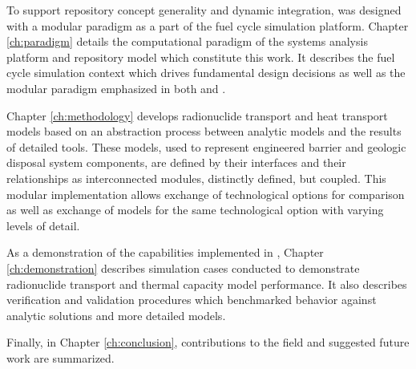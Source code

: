 To support repository concept generality and dynamic integration, \Cyder was 
designed with a modular paradigm as a part of the \Cyclus fuel cycle simulation 
platform. Chapter \ref{ch:paradigm} details the computational paradigm of the 
\Cyclus systems analysis platform and \Cyder repository model which constitute 
this work.  It describes the \Cyclus fuel cycle simulation context which drives 
fundamental \Cyder design decisions as well as the modular paradigm emphasized 
in both \Cyclus and \Cyder. 

Chapter \ref{ch:methodology} develops  radionuclide transport and heat transport 
models based on an abstraction process between analytic models and the results 
of detailed tools.  These models, used to represent engineered barrier and geologic 
disposal system components, are defined by their interfaces and their 
relationships as interconnected modules, distinctly defined, but coupled.  This 
modular implementation allows exchange  of technological options for comparison 
as well as exchange of models for the same technological option with varying 
levels of detail.  

As a demonstration of the capabilities implemented in \Cyder, Chapter 
\ref{ch:demonstration} describes simulation cases conducted to demonstrate 
radionuclide transport and thermal capacity model performance. It also describes 
verification and validation procedures which benchmarked \Cyder behavior against 
analytic solutions and more detailed models.  

Finally, in Chapter \ref{ch:conclusion}, contributions to the field and 
suggested future work are summarized. 




